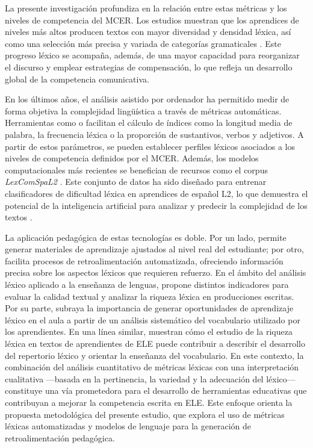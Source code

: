 \documentclass[spanish]{textolivre}
\begin{document}
La presente investigación profundiza en la relación entre estas métricas y los niveles de competencia del MCER. Los estudios muestran que los aprendices de niveles más altos producen textos con mayor diversidad y densidad léxica, así como una selección más precisa y variada de categorías gramaticales \cite{vine_jara2021}. Este progreso léxico se acompaña, además, de una mayor capacidad para reorganizar el discurso y emplear estrategias de compensación, lo que refleja un desarrollo global de la competencia comunicativa.

En los últimos años, el análisis asistido por ordenador ha permitido medir de forma objetiva la complejidad lingüística a través de métricas automáticas. Herramientas como \textcite{antconc2022,sinai_textflow2025} o \textcite{textinspector2026} facilitan el cálculo de índices como la longitud media de palabra, la frecuencia léxica o la proporción de sustantivos, verbos y adjetivos. A partir de estos parámetros, se pueden establecer perfiles léxicos asociados a los niveles de competencia definidos por el MCER. Además, los modelos computacionales más recientes se benefician de recursos como el corpus \textit{LexComSpaL2} \cite{degraeuwe_goethals2024}. Este conjunto de datos ha sido diseñado para entrenar clasificadores de dificultad léxica en aprendices de español L2, lo que demuestra el potencial de la inteligencia artificial para analizar y predecir la complejidad de los textos \cite{jimenez_perez2024}.

La aplicación pedagógica de estas tecnologías es doble. Por un lado, permite generar materiales de aprendizaje ajustados al nivel real del estudiante; por otro, facilita procesos de retroalimentación automatizada, ofreciendo información precisa sobre los aspectos léxicos que requieren refuerzo. En el ámbito del análisis léxico aplicado a la enseñanza de lenguas, \textcite{cuberos_vicente2019} propone distintos indicadores para evaluar la calidad textual y analizar la riqueza léxica en producciones escritas. Por su parte, \textcite{robles_garcia2019} subraya la importancia de generar oportunidades de aprendizaje léxico en el aula a partir de un análisis sistemático del vocabulario utilizado por los aprendientes. En una línea similar, \textcite{vine_jara2021} muestran cómo el estudio de la riqueza léxica en textos de aprendientes de ELE puede contribuir a describir el desarrollo del repertorio léxico y orientar la enseñanza del vocabulario. En este contexto, la combinación del análisis cuantitativo de métricas léxicas con una interpretación cualitativa —basada en la pertinencia, la variedad y la adecuación del léxico— constituye una vía prometedora para el desarrollo de herramientas educativas que contribuyan a mejorar la competencia escrita en ELE. Este enfoque orienta la propuesta metodológica del presente estudio, que explora el uso de métricas léxicas automatizadas y modelos de lenguaje para la generación de retroalimentación pedagógica.
\end{document}
